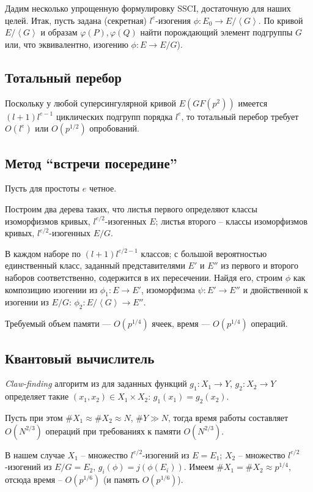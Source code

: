 \documentclass[a4paper,12pt]{article}
\newcommand{\tr}[1]{\left\langle #1\right\rangle}
\theoremstyle{definition}
\begin{document}
Дадим несколько упрощенную формулировку SSCI, достаточную для наших целей. Итак, пусть задана (секретная) $l^e$-изогения $\phi:E_0\to E/\tr{G}$. По кривой $E/\tr{G}$ и образам $\varphi (P), \varphi(Q)$
найти порождающий элемент  подгруппы $ G$ или, что эквивалентно, изогению $\phi:E\to E/G$).
 
 \subsection*{Тотальный перебор}
  
Поскольку у любой суперсингулярной кривой $E (GF(p^2))$ имеется $(l+1)l^{e-1}$ циклических подгрупп порядка $l^e$, то тотальный перебор требует $O(l^e) $ или $O(p^{1/2})$ опробований.
 
 \subsection*{Метод ``встречи посередине''}

 Пусть для простоты $e$ четное.
 
Построим два дерева таких, что листья первого определяют классы изоморфизмов кривых, $l^{e/2}$-изогенных $E$;
листья второго -- классы изоморфизмов кривых, $l^{e/2}$-изогенных $E/G$.

В каждом наборе по $(l+1)l^{e/2-1}$ классов; с большой вероятностью единственный класс, заданный представителями $E'$ и $E''$ из первого и второго наборов соответственно, содержится в их пересечении. Найдя его, строим 
$\phi$ как композицию изогении из $\phi_1:E\to E'$, изоморфизма $\psi:E'\to E''$ и двойственной к изогении из $E/G$: ${\phi}_2:E/\tr{G}\to E''$.

Требуемый объем памяти --- $O(p^{1/4})$ ячеек, время --- $O(p^{1/4})$ операций.


 \subsection*{Квантовый вычислитель}

\emph{Claw-finding} алгоритм из \cite{quant} для заданных функций $g_1:X_1\to Y$, $g_2:X_2\to Y$ определяет такие $(x_1, x_2)\in X_1\times X_2$: $g_1(x_1)=g_2(x_2)$.

Пусть при этом $\#X_1\approx \#X_2 \approx N$, $\#Y\gg N$, тогда время работы составляет $O(N^{2/3})$ операций при требованиях к памяти $O(N^{2/3})$.

В нашем случае $X_1 $ -- множество $l^{e/2}$-изогений  из $E=E_1$; $X_2$ -- множество $l^{e/2}$-изогений  из $E/G=E_2$, $g_i(\phi)=j(\phi(E_i))$.
Имеем $\#X_1=\#X_2\approx p^{1/4}$, отсюда  время -- $O(p^{1/6})$ (и память $O(p^{1/6})$).
\end{document}
